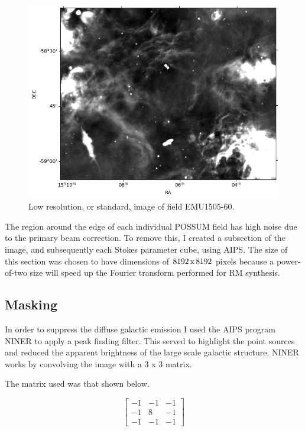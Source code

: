 \begin{figure}

\includegraphics[width=1\linewidth]{Thesis_Template/Figures/lo.png}
\caption{Low resolution, or standard, image of field EMU1505-60.}
\label{fig: low_res}
\end{figure}


The region around the edge of each individual POSSUM field has high noise due to the primary beam correction. To remove this, I created a subsection of the image, and subsequently each Stokes parameter cube, using AIPS. The size of this section was chosen to have dimensions of $8192{\rm \, x\,}8192$ pixels because a power-of-two size will speed up the Fourier transform performed for RM synthesis.


\subsection{Masking}

In order to suppress the diffuse galactic emission I used the AIPS program NINER to apply a peak finding filter. This served to highlight the point sources and reduced the apparent brightness of the large scale galactic structure. NINER works by convolving the image with a 3 x 3 matrix. 

The matrix used was that shown below.


\begin{equation}
    \begin{bmatrix}

    -1 & -1 & -1\\
    -1 & 8 & -1\\
    -1&-1&-1
    
    \end{bmatrix}
    \label{eq: msk2}
\end{equation}

